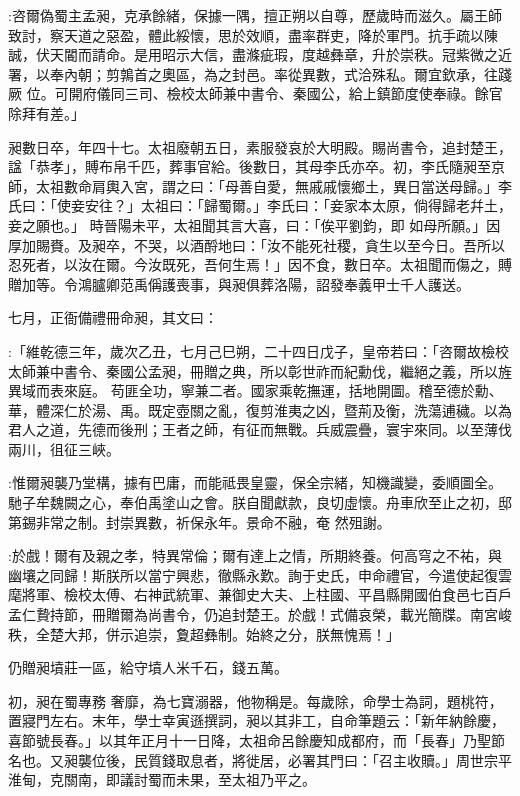 \begin{pinyinscope}
 :咨爾偽蜀主孟昶，克承餘緒，保據一隅，擅正朔以自尊，歷歲時而滋久。屬王師致討，察天道之惡盈，體此綏懷，思於效順，盡率群吏，降於軍門。抗手疏以陳誠，伏天閽而請命。是用昭示大信，盡滌疵瑕，度越彝章，升於崇秩。冠紫微之近署，以奉內朝；剪鶉首之奧區，為之封邑。率從異數，式洽殊私。爾宜欽承，往踐厥
 位。可開府儀同三司、檢校太師兼中書令、秦國公，給上鎮節度使奉祿。餘官除拜有差。」



 昶數日卒，年四十七。太祖廢朝五日，素服發哀於大明殿。賜尚書令，追封楚王，諡「恭孝」，賻布帛千匹，葬事官給。後數日，其母李氏亦卒。初，李氏隨昶至京師，太祖數命肩輿入宮，謂之曰：「母善自愛，無戚戚懷鄉土，異日當送母歸。」李氏曰：「使妾安往？」太祖曰：「歸蜀爾。」李氏曰：「妾家本太原，倘得歸老幷土，妾之願也。」 時晉陽未平，太祖聞其言大喜，曰：「俟平劉鈞，即
 如母所願。」因厚加賜賚。及昶卒，不哭，以酒酹地曰：「汝不能死社稷，貪生以至今日。吾所以忍死者，以汝在爾。今汝既死，吾何生焉！」因不食，數日卒。太祖聞而傷之，賻贈加等。令鴻臚卿范禹偁護喪事，與昶俱葬洛陽，詔發奉義甲士千人護送。



 七月，正衙備禮冊命昶，其文曰：



 :「維乾德三年，歲次乙丑，七月己巳朔，二十四日戊子，皇帝若曰：「咨爾故檢校太師兼中書令、秦國公孟昶，冊贈之典，所以彰世祚而紀勳伐，繼絕之義，所以旌異域而表來庭。
 苟匪全功，寧兼二者。國家乘乾撫運，括地開圖。稽至德於勳、華，體深仁於湯、禹。既定壺關之亂，復剪淮夷之凶，暨荊及衡，洗蕩逋穢。以為君人之道，先德而後刑；王者之師，有征而無戰。兵威震疊，寰宇來同。以至薄伐兩川，徂征三峽。



 :惟爾昶襲乃堂構，據有巴庸，而能祗畏皇靈，保全宗緒，知機識變，委順圖全。馳子牟魏闕之心，奉伯禹塗山之會。朕自聞獻款，良切虛懷。舟車欣至止之初，邸第錫非常之制。封崇異數，祈保永年。景命不融，奄
 然殂謝。



 :於戲！爾有及親之孝，特異常倫；爾有達上之情，所期終養。何高穹之不祐，與幽壤之同歸！斯朕所以當宁興悲，徹縣永歎。詢于史氏，申命禮官，今遣使起復雲麾將軍、檢校太傅、右神武統軍、兼御史大夫、上柱國、平昌縣開國伯食邑七百戶孟仁贄持節，冊贈爾為尚書令，仍追封楚王。於戲！式備哀榮，載光簡牒。南宮峻秩，全楚大邦，併示追崇，夐超彝制。始終之分，朕無愧焉！」



 仍贈昶墳莊一區，給守墳人米千石，錢五萬。



 初，昶在蜀專務
 奢靡，為七寶溺器，他物稱是。每歲除，命學士為詞，題桃符，置寢門左右。末年，學士幸寅遜撰詞，昶以其非工，自命筆題云：「新年納餘慶，喜節號長春。」以其年正月十一日降，太祖命呂餘慶知成都府，而「長春」乃聖節名也。又昶襲位後，民質錢取息者，將徙居，必署其門曰：「召主收贖。」周世宗平淮甸，克關南，即議討蜀而未果，至太祖乃平之。




\end{pinyinscope}
